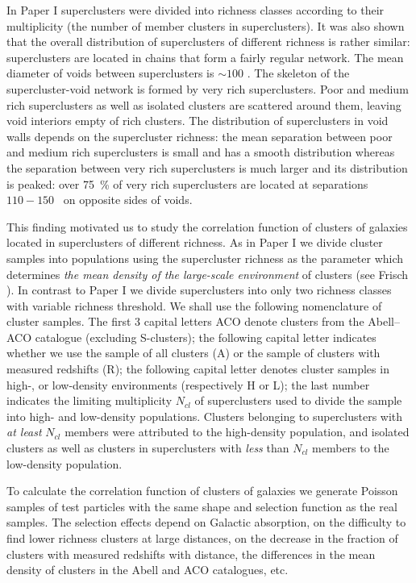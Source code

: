 In Paper I superclusters were divided into richness classes according
to their multiplicity (the number of member clusters in
superclusters).  It was also shown that the overall distribution of
superclusters of different richness is rather similar: superclusters
are located in chains that form a fairly regular network. The mean
diameter of voids between superclusters is $\sim 100$ \Mpc.  The
skeleton of the supercluster-void network is formed by very rich
superclusters. Poor and medium rich superclusters as well as isolated
clusters are scattered around them, leaving void interiors empty of
rich clusters. The distribution of superclusters in void walls depends
on the supercluster richness: the mean separation between poor and
medium rich superclusters is small and has a smooth distribution
whereas the separation between very rich superclusters is much larger
and its distribution is peaked: over 75~\% of very rich superclusters
are located at separations $110 - 150$ \Mpc\ on opposite sides of
voids.


This finding motivated us to study the correlation function of clusters of
galaxies located in superclusters of different richness.  As in Paper I we
divide cluster samples into populations using the supercluster richness as the
parameter which determines {\it the mean density of the large-scale
  environment} of clusters (see Frisch ).  In contrast to Paper I we
divide superclusters into only two richness classes with variable richness
threshold. We shall use the following nomenclature of cluster samples. The
first 3 capital letters ACO denote clusters from the Abell--ACO catalogue
(excluding S-clusters); the following capital letter indicates whether we use
the sample of all clusters (A) or the sample of clusters with measured
redshifts (R); the following capital letter denotes cluster samples in high-,
or low-density environments (respectively H or L); the last number indicates
the limiting multiplicity $N_{cl}$ of superclusters used to divide the sample
into high- and low-density populations.  Clusters belonging to superclusters
with {\it at least} $N_{cl}$ members were attributed to the high-density
population, and isolated clusters as well as clusters in superclusters with
{\it less} than $N_{cl}$ members to the low-density population.


To calculate the correlation function of clusters of galaxies we 
generate Poisson samples of test particles with the same shape and
selection function as the real samples.  The selection effects depend
on Galactic absorption, on the difficulty to find lower richness 
clusters at large distances, on the decrease in the fraction of
clusters with measured redshifts with distance, the differences in the
mean density of clusters in the Abell and ACO catalogues, etc.

